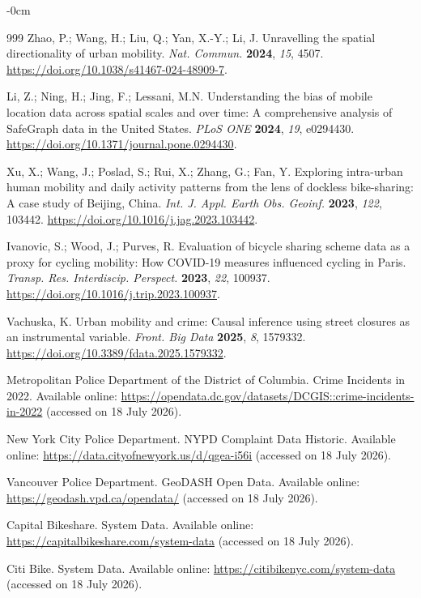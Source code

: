 \documentclass[applsci,article,submit,moreauthors]{Definitions/mdpi}
\begin{document}
\begin{adjustwidth}{-\extralength}{0cm}
\begin{thebibliography}{999}
Zhao, P.; Wang, H.; Liu, Q.; Yan, X.-Y.; Li, J. Unravelling the spatial directionality of urban mobility. \emph{Nat. Commun.} \textbf{2024}, \emph{15}, 4507. \url{https://doi.org/10.1038/s41467-024-48909-7}.

Li, Z.; Ning, H.; Jing, F.; Lessani, M.N. Understanding the bias of mobile location data across spatial scales and over time: A comprehensive analysis of SafeGraph data in the United States. \emph{PLoS ONE} \textbf{2024}, \emph{19}, e0294430. \url{https://doi.org/10.1371/journal.pone.0294430}.

Xu, X.; Wang, J.; Poslad, S.; Rui, X.; Zhang, G.; Fan, Y. Exploring
intra-urban human mobility and daily activity patterns from the lens of
dockless bike-sharing: A case study of Beijing, China.
\emph{Int. J. Appl. Earth Obs. Geoinf.} \textbf{2023}, \emph{122}, 103442.
\url{https://doi.org/10.1016/j.jag.2023.103442}.

Ivanovic, S.; Wood, J.; Purves, R. Evaluation of bicycle sharing scheme
data as a proxy for cycling mobility: How COVID-19 measures influenced
cycling in Paris. \emph{Transp. Res. Interdiscip. Perspect.} \textbf{2023},
\emph{22}, 100937. \url{https://doi.org/10.1016/j.trip.2023.100937}.

Vachuska, K. Urban mobility and crime: Causal inference using street closures as an instrumental variable. \emph{Front. Big Data} \textbf{2025}, \emph{8}, 1579332. \url{https://doi.org/10.3389/fdata.2025.1579332}.

Metropolitan Police Department of the District of Columbia. Crime
Incidents in 2022. Available online:
\url{https://opendata.dc.gov/datasets/DCGIS::crime-incidents-in-2022}
(accessed on 18 July 2026).

New York City Police Department. NYPD Complaint Data Historic.
Available online:
\url{https://data.cityofnewyork.us/d/qgea-i56i}
(accessed on 18 July 2026).

Vancouver Police Department. GeoDASH Open Data. Available online:
\url{https://geodash.vpd.ca/opendata/}
(accessed on 18 July 2026).

Capital Bikeshare. System Data. Available online:
\url{https://capitalbikeshare.com/system-data}
(accessed on 18 July 2026).

Citi Bike. System Data. Available online:
\url{https://citibikenyc.com/system-data}
(accessed on 18 July 2026).


\end{thebibliography}
\end{adjustwidth}
\end{document}
